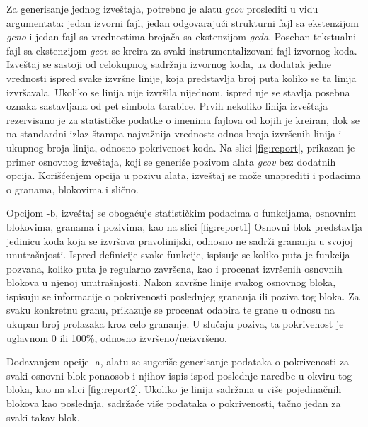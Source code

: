 \documentclass[12pt,oneside]{memoir}
\newcommand{\strano}[1]{\textit{#1}}
\begin{document}
Za generisanje jednog izveštaja, potrebno je alatu \strano{gcov} proslediti u vidu argumentata: jedan izvorni fajl, jedan odgovarajući strukturni fajl sa ekstenzijom \strano{gcno} i jedan fajl sa vrednostima brojača sa ekstenzijom \strano{gcda}. Poseban tekstualni fajl sa ekstenzijom \strano{gcov} se kreira za svaki instrumentalizovani fajl izvornog koda. Izveštaj se sastoji od celokupnog sadržaja izvornog koda, uz dodatak jedne vrednosti ispred svake izvršne linije, koja predstavlja broj puta koliko se ta linija izvršavala. Ukoliko se linija nije izvršila nijednom, ispred nje se stavlja posebna oznaka sastavljana od pet simbola tarabice. Prvih nekoliko linija izveštaja rezervisano je za statističke podatke o imenima fajlova od kojih je kreiran, dok se na standardni izlaz štampa najvažnija vrednost: odnos broja izvršenih linija i ukupnog broja linija, odnosno pokrivenost koda. Na slici \ref{fig:report}, prikazan je primer osnovnog izveštaja, koji se generiše pozivom alata \strano{gcov} bez dodatnih opcija. Korišćenjem opcija u pozivu alata, izveštaj se može unaprediti i podacima o granama, blokovima i slično. 

Opcijom -b, izveštaj se obogaćuje statističkim podacima o funkcijama, osnovnim blokovima, granama i pozivima, kao na slici \ref{fig:report1} Osnovni blok predstavlja jedinicu koda koja se izvršava pravolinijski, odnosno ne sadrži grananja u svojoj unutrašnjosti.
Ispred definicije svake funkcije, ispisuje se koliko puta je funkcija pozvana, koliko puta je regularno završena, kao i procenat izvršenih osnovnih blokova u njenoj unutrašnjosti.
Nakon završne linije svakog osnovnog bloka, ispisuju se informacije o pokrivenosti poslednjeg grananja ili poziva tog bloka. Za svaku konkretnu granu, prikazuje se procenat odabira te grane u odnosu na ukupan broj prolazaka kroz celo grananje. U slučaju poziva, ta pokrivenost je uglavnom 0 ili 100\%, odnosno izvršeno/neizvršeno. 

Dodavanjem opcije -a, alatu se sugeriše generisanje podataka o pokrivenosti za svaki osnovni blok ponaosob i njihov ispis ispod poslednje naredbe u okviru tog bloka, kao na slici \ref{fig:report2}. Ukoliko je linija sadržana u više pojedinačnih blokova kao poslednja, sadržaće više podataka o pokrivenosti, tačno jedan za svaki takav blok. 
\end{document}
